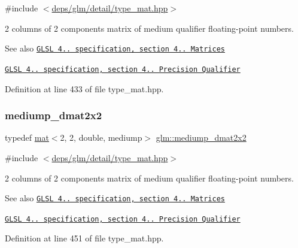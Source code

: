 {\ttfamily \#include $<$\hyperlink{type__mat_8hpp}{deps/glm/detail/type\+\_\+mat.\+hpp}$>$}

2 columns of 2 components matrix of medium qualifier floating-\/point numbers.

\begin{DoxySeeAlso}{See also}
\href{http://www.opengl.org/registry/doc/GLSLangSpec.4.20.8.pdf}{\tt G\+L\+SL 4.. specification, section 4.. Matrices} 

\href{http://www.opengl.org/registry/doc/GLSLangSpec.4.20.8.pdf}{\tt G\+L\+SL 4.. specification, section 4.. Precision Qualifier} 
\end{DoxySeeAlso}


Definition at line 433 of file type\+\_\+mat.\+hpp.

\mbox{\label{group__core__precision_ga3d91f269872b4664d2f500b6dee986eb}} 
\subsubsection{\texorpdfstring{mediump\+\_\+dmat2x2}{mediump\_dmat2x2}}
{\footnotesize\ttfamily typedef \hyperlink{structglm_1_1mat}{mat}$<$2, 2, double, mediump$>$ \hyperlink{group__core__precision_ga3d91f269872b4664d2f500b6dee986eb}{glm\+::mediump\+\_\+dmat2x2}}



{\ttfamily \#include $<$\hyperlink{type__mat_8hpp}{deps/glm/detail/type\+\_\+mat.\+hpp}$>$}

2 columns of 2 components matrix of medium qualifier floating-\/point numbers.

\begin{DoxySeeAlso}{See also}
\href{http://www.opengl.org/registry/doc/GLSLangSpec.4.20.8.pdf}{\tt G\+L\+SL 4.. specification, section 4.. Matrices} 

\href{http://www.opengl.org/registry/doc/GLSLangSpec.4.20.8.pdf}{\tt G\+L\+SL 4.. specification, section 4.. Precision Qualifier} 
\end{DoxySeeAlso}


Definition at line 451 of file type\+\_\+mat.\+hpp.

\mbox{\label{group__core__precision_gaf3a6e61247ffcbbf9211186d0d250a2b}} 
